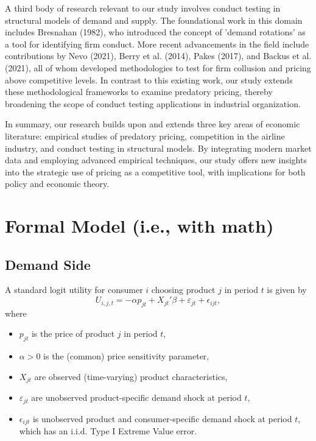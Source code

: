 \documentclass[12pt,oneside]{article}
\theoremstyle{definition}
\theoremstyle{remark}
\begin{document}
A third body of research relevant to our study involves conduct testing in structural models of demand and supply. The foundational work in this domain includes Bresnahan (1982), who introduced the concept of 'demand rotations' as a tool for identifying firm conduct. More recent advancements in the field include contributions by Nevo (2021), Berry et al. (2014), Pakes (2017), and Backus et al. (2021), all of whom developed methodologies to test for firm collusion and pricing above competitive levels. In contrast to this existing work, our study extends these methodological frameworks to examine predatory pricing, thereby broadening the scope of conduct testing applications in industrial organization.

In summary, our research builds upon and extends three key areas of economic literature: empirical studies of predatory pricing, competition in the airline industry, and conduct testing in structural models. By integrating modern market data and employing advanced empirical techniques, our study offers new insights into the strategic use of pricing as a competitive tool, with implications for both policy and economic theory.

\section{Formal Model (i.e., with math)}


\subsection{Demand Side}
A standard logit utility for consumer $i$ choosing product $j$ in period $t$ is given by
\begin{equation}
U_{i,j,t} 
= - \alpha p_{jt} + X_{jt}'\beta + \varepsilon_{jt} + \epsilon_{ijt},
\end{equation}
where
\begin{itemize}[leftmargin=2em]
    \item $p_{jt}$ is the price of product $j$ in period $t$,
    \item $\alpha > 0$ is the (common) price sensitivity parameter,
    \item $X_{jt}$ are observed (time-varying) product characteristics,
    \item $\varepsilon_{jt}$ are unobserved product-specific demand shock at period $t$,
    \item $\epsilon_{ijt}$ is unobserved product and consumer-specific demand shock at period $t$, which has an i.i.d. Type I Extreme Value error.
\end{itemize}
\end{document}
